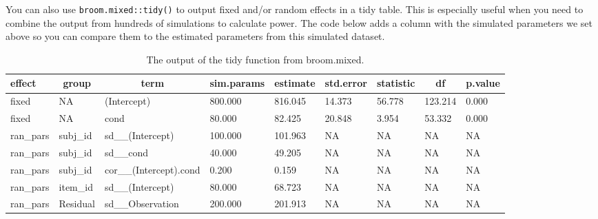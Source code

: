 \documentclass[man,floatsintext]{apa6}
\newenvironment{Shaded}{\begin{snugshade}}{\end{snugshade}}
\newcommand{\KeywordTok}[1]{\textcolor[rgb]{0.13,0.29,0.53}{\textbf{#1}}}
\newcommand{\DataTypeTok}[1]{\textcolor[rgb]{0.13,0.29,0.53}{#1}}
\newcommand{\DecValTok}[1]{\textcolor[rgb]{0.00,0.00,0.81}{#1}}
\newcommand{\StringTok}[1]{\textcolor[rgb]{0.31,0.60,0.02}{#1}}
\newcommand{\OperatorTok}[1]{\textcolor[rgb]{0.81,0.36,0.00}{\textbf{#1}}}
\newcommand{\NormalTok}[1]{#1}
\begin{document}
You can also use \texttt{broom.mixed::tidy()} to output fixed and/or
random effects in a tidy table. This is especially useful when you need
to combine the output from hundreds of simulations to calculate power.
The code below adds a column with the simulated parameters we set above
so you can compare them to the estimated parameters from this simulated
dataset.

\begin{Shaded}
\end{Shaded}

\begin{table}[tbp]
\begin{center}
\begin{threeparttable}
\caption{\label{tab:unnamed-chunk-9}The output of the tidy function from broom.mixed.}
\begin{tabular}{lllllllll}
\toprule
effect & \multicolumn{1}{c}{group} & \multicolumn{1}{c}{term} & \multicolumn{1}{c}{sim.params} & \multicolumn{1}{c}{estimate} & \multicolumn{1}{c}{std.error} & \multicolumn{1}{c}{statistic} & \multicolumn{1}{c}{df} & \multicolumn{1}{c}{p.value}\\
\midrule
fixed & NA & (Intercept) & 800.000 & 816.045 & 14.373 & 56.778 & 123.214 & 0.000\\
fixed & NA & cond & 80.000 & 82.425 & 20.848 & 3.954 & 53.332 & 0.000\\
ran\_pars & subj\_id & sd\_\_(Intercept) & 100.000 & 101.963 & NA & NA & NA & NA\\
ran\_pars & subj\_id & sd\_\_cond & 40.000 & 49.205 & NA & NA & NA & NA\\
ran\_pars & subj\_id & cor\_\_(Intercept).cond & 0.200 & 0.159 & NA & NA & NA & NA\\
ran\_pars & item\_id & sd\_\_(Intercept) & 80.000 & 68.723 & NA & NA & NA & NA\\
ran\_pars & Residual & sd\_\_Observation & 200.000 & 201.913 & NA & NA & NA & NA\\
\bottomrule
\end{tabular}
\end{threeparttable}
\end{center}
\end{table}
\end{document}
